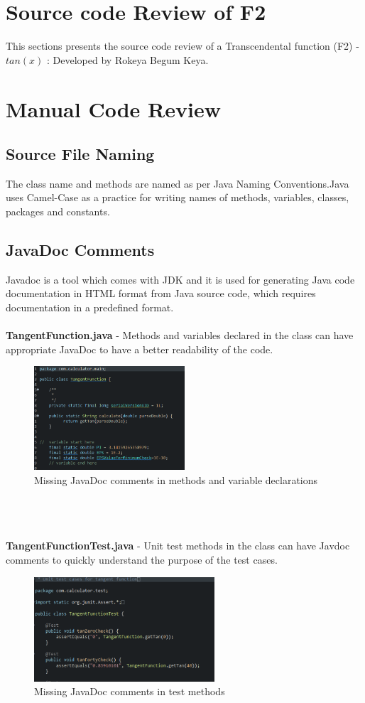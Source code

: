 \documentclass[letterpaper, 11pt]{report}
\begin{document}
\section*{Source code Review of F2}
This sections presents the source code review of a  Transcendental function (F2) - $tan(x)$ : Developed by Rokeya Begum Keya.

\section*{Manual Code Review}
\subsection*{Source File Naming}
The class name and methods are named as per Java Naming Conventions.Java uses Camel-Case as a practice for writing names of methods, variables, classes, packages and constants.
\subsection*{JavaDoc Comments}
Javadoc is a tool which comes with JDK and it is used for generating Java code documentation in HTML format from Java source code, which requires documentation in a predefined format.\\\\
\textbf{TangentFunction.java} - Methods and variables declared in the class can have appropriate JavaDoc to have a better readability of the code.\\
\begin{figure}[htb]
\includegraphics[width=0.5\textwidth]{F2_Code_Review_JavaDoc}
\centering
\caption{Missing JavaDoc comments in methods and variable declarations}
\end{figure}
\\\\\\
\textbf{TangentFunctionTest.java} - Unit test methods in the class can have Javdoc comments to quickly understand the purpose of the test cases.
\begin{figure}[htb]
\includegraphics[width=0.6\textwidth]{F2_Code_Review_JavaDoc_TestCase}
\centering
\caption{Missing JavaDoc comments in test methods}
\end{figure}
\end{document}
